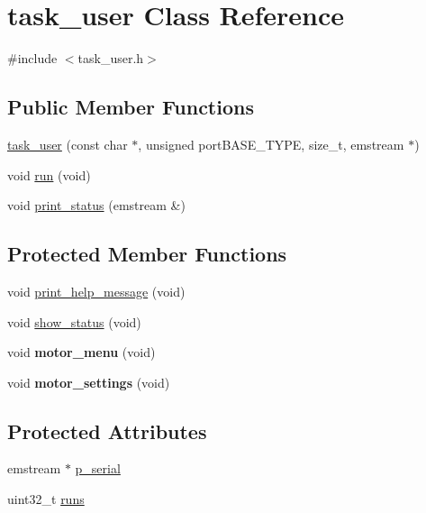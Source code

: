 \hypertarget{classtask__user}{\section{task\-\_\-user \-Class \-Reference}
\label{classtask__user}
}


{\ttfamily \#include $<$task\-\_\-user.\-h$>$}

\subsection*{\-Public \-Member \-Functions}
\begin{DoxyCompactItemize}
\item 
\hyperlink{classtask__user_a3aba77563b375bb14838800608da48bc}{task\-\_\-user} (const char $\ast$, unsigned port\-B\-A\-S\-E\-\_\-\-T\-Y\-P\-E, size\-\_\-t, emstream $\ast$)
\item 
void \hyperlink{classtask__user_adca6429d57be25e8d411414fc8ad75af}{run} (void)
\item 
void \hyperlink{classtask__user_a78170e5ebe8dca1ce0a5a09c507399f1}{print\-\_\-status} (emstream \&)
\end{DoxyCompactItemize}
\subsection*{\-Protected \-Member \-Functions}
\begin{DoxyCompactItemize}
\item 
void \hyperlink{classtask__user_a75475060f83bae1e44bcc8a5c34015c7}{print\-\_\-help\-\_\-message} (void)
\item 
void \hyperlink{classtask__user_a105bebbd9cb1031154c3dfc3662db4a0}{show\-\_\-status} (void)
\item 
\hypertarget{classtask__user_a62e9a23d2a052ef1c34ef4c6f1152032}{void {\bfseries motor\-\_\-menu} (void)}\label{classtask__user_a62e9a23d2a052ef1c34ef4c6f1152032}

\item 
\hypertarget{classtask__user_aab1a6f3f0ea7acce28c845a0cf992e6d}{void {\bfseries motor\-\_\-settings} (void)}\label{classtask__user_aab1a6f3f0ea7acce28c845a0cf992e6d}

\end{DoxyCompactItemize}
\subsection*{\-Protected \-Attributes}
\begin{DoxyCompactItemize}
\item 
emstream $\ast$ \hyperlink{classtask__user_a04ed5c2b4d7c9a1530bde6f217e01681}{p\-\_\-serial}
\item 
uint32\-\_\-t \hyperlink{classtask__user_ac85973422902084fc9a4692250be32fe}{runs}
\end{DoxyCompactItemize}


